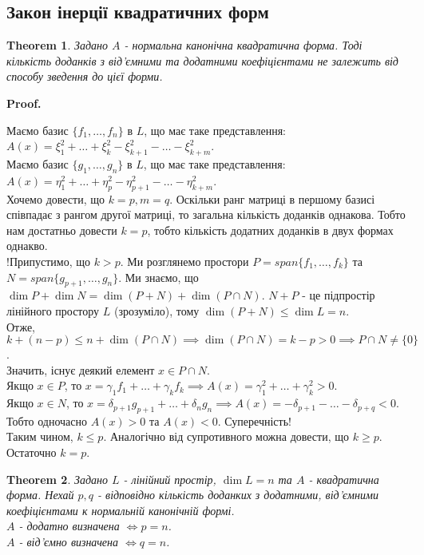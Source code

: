 \documentclass[a4paper, 10pt]{article}
\makeatletter
\theoremstyle{theoremdd}
\newtheorem{theorem}{Theorem}[subsection]
\renewenvironment{proof}[1][Proof.\\]{\par
\pushQED{\hfill \qed}%
\normalfont \topsep6\p@\@plus6\p@\relax
\trivlist
\item\relax
{\bfseries
#1\@addpunct{.}}\hspace\labelsep\ignorespaces
}{%
\popQED\endtrivlist\@endpefalse
}
\makeatother
\begin{document}
\subsection{Закон інерції квадратичних форм}
\begin{theorem}
Задано $A$ - нормальна канонічна квадратична форма. Тоді кількість доданків з від'ємними та додатними коефіцієнтами не залежить від способу зведення до цієї форми.
\end{theorem}

\begin{proof}
Маємо базис $\{f_1,\dots,f_n\}$ в $L$, що має таке представлення: $A(x) = \xi_1^2 + \dots + \xi_k^2 - \xi_{k+1}^2 - \dots - \xi_{k+m}^2$.\\
Маємо базис $\{g_1,\dots,g_n\}$ в $L$, що має таке представлення: $A(x) = \eta_1^2 + \dots + \eta_p^2 - \eta_{p+1}^2 - \dots - \eta_{k+m}^2$.\\
Хочемо довести, що $k=p, m=q$. Оскільки ранг матриці в першому базисі співпадає з рангом другої матриці, то загальна кількість доданків однакова. Тобто нам достатньо довести $k=p$, тобто кількість додатних доданків в двух формах однакво.\\
!Припустимо, що $k > p$. Ми розглянемо простори $P = span\{f_1,\dots,f_k\}$ та $N = span\{g_{p+1},\dots,g_n\}$. Ми знаємо, що $\dim P + \dim N = \dim (P+N) + \dim (P \cap N)$. $N+P$ - це підпростір лінійного простору $L$ (зрозуміло), тому $\dim (P+N) \leq \dim L = n$.\\
Отже, $k + (n-p) \leq n + \dim (P \cap N) \implies \dim (P \cap N) = k - p > 0 \implies P \cap N \neq \{0\}$.\\
Значить, існує деякий елемент $x \in P \cap N$. \\
Якщо $x \in P$, то $x = \gamma_1 f_1 + \dots + \gamma_k f_k \implies A(x) = \gamma_1^2 + \dots + \gamma_k^2 > 0$.\\
Якщо $x \in N$, то $x = \delta_{p+1} g_{p+1} + \dots + \delta_n g_n \implies A(x) = -\delta_{p+1} - \dots - \delta_{p+q} < 0$.\\
Тобто одночасно $A(x) > 0$ та $A(x) < 0$. Суперечність!\\
Таким чином, $k \leq p$. Аналогічно від супротивного можна довести, що $k \geq p$. Остаточно $k=p$. 
\end{proof}

\begin{theorem}
Задано $L$ - лінійний простір, $\dim L = n$ та $A$ - квадратична форма. Нехай $p,q$ - відповідно кількість доданких з додатними, від'ємними коефіцієнтами к нормальній канонічній формі.\\
$A$ - додатно визначена $\iff p = n$.\\
$A$ - від'ємно визначена $\iff q = n$.
\end{theorem}
\end{document}
